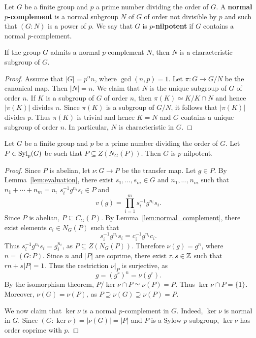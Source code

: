Let $G$ be a finite group and $p$ a prime number dividing the order of $G$. A 
\textbf{normal $p$-complement} is a normal subgroup $N$ of $G$ of
order not divisible by $p$ and such that $(G:N)$ is a power of $p$.
We say that $G$ is \textbf{$p$-nilpotent} if $G$ contains a normal $p$-complement.

\begin{proposition}
	If the group $G$ admits a normal $p$-complement $N$, then $N$ is a characteristic subgroup of $G$.
\end{proposition}

\begin{proof}
	Assume that $|G|=p^\alpha n$, where $\gcd(n,p)=1$. Let 
	$\pi\colon G\to G/N$ be the canonical map. Then $|N|=n$. We claim that 
	$N$ is the unique subgroup of $G$ of order $n$. If
	$K$ is a subgroup of $G$ of order $n$, then $\pi(K)\simeq K/K\cap N$
	and hence $|\pi(K)|$ divides $n$. Since $\pi(K)$ is a subgroup of $G/N$, 
	it follows that 
	$|\pi(K)|$ divides $p$. Thus $\pi(K)$ is trivial and hence 
	$K=N$ and $G$ contains a unique subgroup of order $n$. In particular, $N$ is characteristic in $G$. 
\end{proof}

\begin{theorem}[Burnside]
	\label{thm:Burnside:normal_complement}
	Let $G$ be a finite group and $p$ be a prime number dividing the order of $G$. Let
	$P\in\mathrm{Syl}_p(G)$ be such that $P\subseteq Z(N_G(P))$. Then $G$ is
	$p$-nilpotent.
\end{theorem}

\begin{proof}
	Since $P$ is abelian, let $\nu\colon G\to P$ be the transfer map. 
	Let $g\in P$.  By Lemma~\ref{lem:evaluation}, there exist $s_1,\dots,s_m\in
	G$ and $n_1,\dots,n_m$ such that $n_1+\cdots+n_m=n$,
	$s_i^{-1}g^{n_i}s_i\in P$ and  
	\[
		v(g)=\prod_{i=1}^m s_i^{-1}g^{n_i}s_i.
	\]
	Since $P$ is abelian, $P\subseteq C_G(P)$. By Lemma~\ref{lem:normal_complement}, 
	there exist elements $c_i\in N_G(P)$ such that 
	\[
	s_i^{-1}g^{n_i}s_i=c_i^{-1}g^{n_i}c_i.
	\]
	Thus $s_i^{-1}g^{n_i}s_i=g_i^{n_i}$, as $P\subseteq Z(N_G(P))$. Therefore 
	$\nu(g)=g^n$, where $n=(G:P)$. Since $n$ and $|P|$ are coprime, 
	there exist $r,s\in\mathbb{Z}$ such that $rn+s|P|=1$. Thus the restriction 
	$\nu|_P$ is surjective, as 
	\[
	g=(g^r)^n=\nu(g^r).
	\]
	By the isomorphism theorem, $P/\ker\nu\cap P\simeq\nu(P)=P$. 
	Thus $\ker\nu\cap P=\{1\}$. Moreover, $\nu(G)=\nu(P)$, as  
	$P\supseteq \nu(G)\supseteq \nu(P)=P$.
	
	We now claim that $\ker\nu$ is a normal $p$-complement in $G$. Indeed, $\ker\nu$ is normal in $G$. 
	Since $(G:\ker\nu)=|\nu(G)|=|P|$ and $P$ is a Sylow $p$-subgroup, 
	$\ker\nu$ has order coprime with $p$.
\end{proof}

